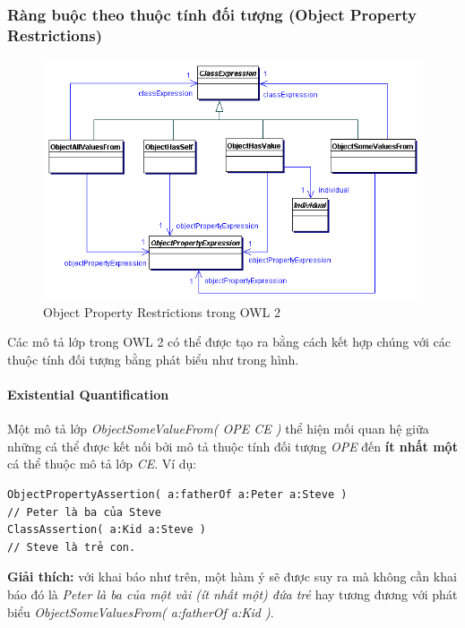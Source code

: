 \subsubsection{Ràng buộc theo thuộc tính đối tượng (Object Property Restrictions)}
\begin{figure}[h]
	\centering
	\includegraphics[width=150mm]{Figures/ce_1.png}
	\caption{Object Property Restrictions trong OWL 2\label{overflow}}
\end{figure}
Các mô tả lớp trong OWL 2 có thể được tạo ra bằng cách kết hợp chúng với các thuộc tính đối tượng bằng phát biểu như trong hình.


\paragraph{Existential Quantification} Một mô tả lớp \textit{ObjectSomeValueFrom( OPE CE )} thể hiện mối quan hệ giữa những cá thể được kết nối bởi mô tả thuộc tính đối tượng \textit{OPE} đến \textbf{ít nhất một} cá thể thuộc mô tả lớp \textit{CE}. Ví dụ:
\begin{verbatim}
ObjectPropertyAssertion( a:fatherOf a:Peter a:Steve ) 
// Peter là ba của Steve                    
ClassAssertion( a:Kid a:Steve )         
// Steve là trẻ con.
\end{verbatim} 
\textbf{Giải thích:} với khai báo như trên, một hàm ý sẽ được suy ra mà không cần khai báo đó là \textit{Peter là ba của một vài (ít nhất một) đứa trẻ} hay tương đương với phát biểu \textit{ObjectSomeValuesFrom( a:fatherOf a:Kid )}.

